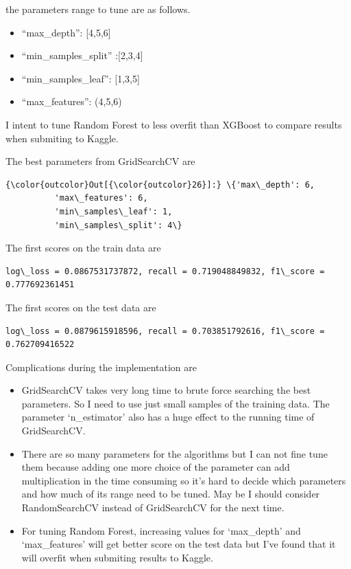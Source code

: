 \documentclass[11pt]{article}
\begin{document}
the parameters range to tune are as follows.

\begin{itemize}
\itemsep1pt\parskip0pt
\item
  ``max\_depth'': {[}4,5,6{]}
\item
  ``min\_samples\_split'' :{[}2,3,4{]}
\item
  ``min\_samples\_leaf'': {[}1,3,5{]}
\item
  ``max\_features'': (4,5,6)
\end{itemize}

I intent to tune Random Forest to less overfit than XGBoost to compare
results when submiting to Kaggle.

    The best parameters from GridSearchCV are

            \begin{Verbatim}[commandchars=\\\{\}]
{\color{outcolor}Out[{\color{outcolor}26}]:} \{'max\_depth': 6,
          'max\_features': 6,
          'min\_samples\_leaf': 1,
          'min\_samples\_split': 4\}
\end{Verbatim}
        
    The first scores on the train data are

    \begin{Verbatim}[commandchars=\\\{\}]
log\_loss = 0.0867531737872, recall = 0.719048849832, f1\_score = 0.777692361451

    \end{Verbatim}

    The first scores on the test data are

    \begin{Verbatim}[commandchars=\\\{\}]
log\_loss = 0.0879615918596, recall = 0.703851792616, f1\_score = 0.762709416522

    \end{Verbatim}

    Complications during the implementation are

\begin{itemize}
\itemsep1pt\parskip0pt
\item
  GridSearchCV takes very long time to brute force searching the best
  parameters. So I need to use just small samples of the training data.
  The parameter `n\_estimator' also has a huge effect to the running
  time of GridSearchCV.
\item
  There are so many parameters for the algorithms but I can not fine
  tune them because adding one more choice of the parameter can add
  multiplication in the time consuming so it's hard to decide which
  parameters and how much of its range need to be tuned. May be I should
  consider RandomSearchCV instead of GridSearchCV for the next time.
\item
  For tuning Random Forest, increasing values for `max\_depth' and
  `max\_features' will get better score on the test data but I've found
  that it will overfit when submiting results to Kaggle.
\end{itemize}
\end{document}

